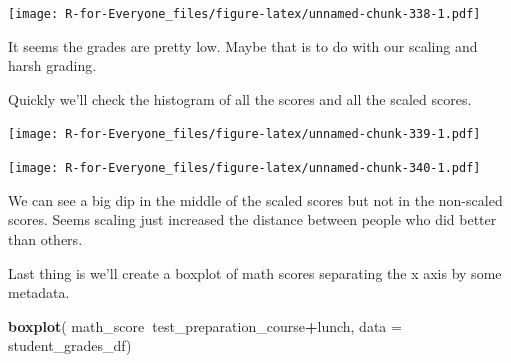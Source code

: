 \documentclass[]{book}
\newenvironment{Shaded}{\begin{snugshade}}{\end{snugshade}}
\newcommand{\KeywordTok}[1]{\textcolor[rgb]{0.13,0.29,0.53}{\textbf{#1}}}
\newcommand{\DataTypeTok}[1]{\textcolor[rgb]{0.13,0.29,0.53}{#1}}
\newcommand{\CommentTok}[1]{\textcolor[rgb]{0.56,0.35,0.01}{\textit{#1}}}
\newcommand{\OperatorTok}[1]{\textcolor[rgb]{0.81,0.36,0.00}{\textbf{#1}}}
\newcommand{\NormalTok}[1]{#1}
\begin{document}
\texttt{[image: R-for-Everyone\_files/figure-latex/unnamed-chunk-338-1.pdf]}

It seems the grades are pretty low. Maybe that is to do with our scaling
and harsh grading.

Quickly we'll check the histogram of all the scores and all the scaled
scores.

\begin{Shaded}
\end{Shaded}

\texttt{[image: R-for-Everyone\_files/figure-latex/unnamed-chunk-339-1.pdf]}

\begin{Shaded}
\end{Shaded}

\texttt{[image: R-for-Everyone\_files/figure-latex/unnamed-chunk-340-1.pdf]}

We can see a big dip in the middle of the scaled scores but not in the
non-scaled scores. Seems scaling just increased the distance between
people who did better than others.

Last thing is we'll create a boxplot of math scores separating the x
axis by some metadata.

\begin{Shaded}
\begin{Highlighting}[]
\KeywordTok{boxplot}\NormalTok{(}
\NormalTok{  math_score}\OperatorTok{~}\NormalTok{test_preparation_course}\OperatorTok{+}\NormalTok{lunch,}
  \DataTypeTok{data =}\NormalTok{ student_grades_df)}
\end{Highlighting}
\end{Shaded}
\end{document}
